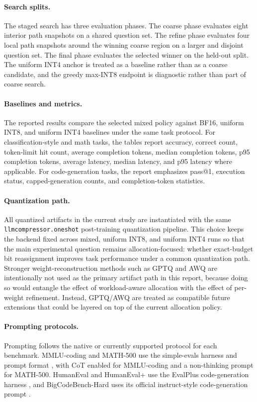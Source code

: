 \documentclass{article}
\newcommand{\intfour}{INT4}
\newcommand{\inteight}{INT8}
\begin{document}
\paragraph{Search splits.}
The staged search has three evaluation phases. The coarse phase evaluates eight interior path snapshots on a shared question set. The refine phase evaluates four local path snapshots around the winning coarse region on a larger and disjoint question set. The final phase evaluates the selected winner on the held-out split. The uniform \intfour{} anchor is treated as a baseline rather than as a coarse candidate, and the greedy max-\inteight{} endpoint is diagnostic rather than part of coarse search.

\paragraph{Baselines and metrics.}
The reported results compare the selected mixed policy against BF16, uniform \inteight{}, and uniform \intfour{} baselines under the same task protocol. For classification-style and math tasks, the tables report accuracy, correct count, token-limit hit count, average completion tokens, median completion tokens, p95 completion tokens, average latency, median latency, and p95 latency where applicable. For code-generation tasks, the report emphasizes pass@1, execution status, capped-generation counts, and completion-token statistics.

\paragraph{Quantization path.}
All quantized artifacts in the current study are instantiated with the same \texttt{llmcompressor.oneshot} post-training quantization pipeline. This choice keeps the backend fixed across mixed, uniform \inteight{}, and uniform \intfour{} runs so that the main experimental question remains allocation-focused: whether exact-budget bit reassignment improves task performance under a common quantization path. Stronger weight-reconstruction methods such as GPTQ \cite{frantar2023gptq} and AWQ \cite{lin2024awq} are intentionally not used as the primary artifact path in this report, because doing so would entangle the effect of workload-aware allocation with the effect of per-weight refinement. Instead, GPTQ/AWQ are treated as compatible future extensions that could be layered on top of the current allocation policy.

\paragraph{Prompting protocols.}
Prompting follows the native or currently supported protocol for each benchmark. MMLU-coding and MATH-500 use the simple-evals harness and prompt format \cite{openai_simple_evals}, with CoT enabled for MMLU-coding and a non-thinking prompt for MATH-500. HumanEval and HumanEval+ use the EvalPlus code-generation harness \cite{liu2023evalplus}, and BigCodeBench-Hard uses its official instruct-style code-generation prompt \cite{zhuo2025bigcodebench}.
\end{document}

